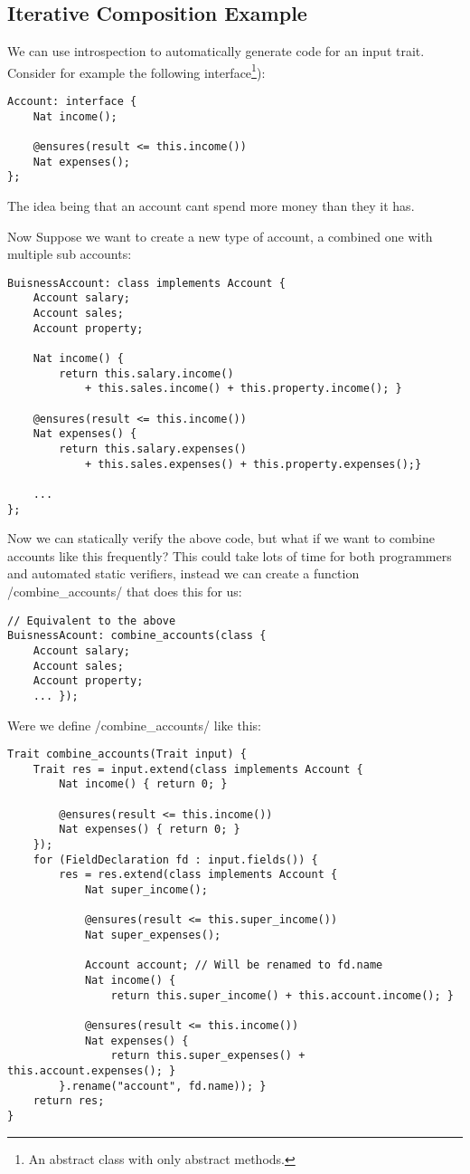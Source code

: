 \subsection{Iterative Composition Example}
We can use introspection to automatically generate code for an input trait. Consider for example the following interface\footnote{An abstract class with only abstract methods.}):
\begin{lstlisting}
Account: interface {
	Nat income();

	@ensures(result <= this.income())
	Nat expenses();
};
\end{lstlisting}

\noindent The idea being that an account cant spend more money than they it has.

Now Suppose we want to create a new type of account, a combined one with multiple sub accounts:
\begin{lstlisting}
BuisnessAccount: class implements Account {
	Account salary;
	Account sales;
	Account property;
	
	Nat income() {
		return this.salary.income() 
			+ this.sales.income() + this.property.income(); }
	
	@ensures(result <= this.income())
	Nat expenses() { 
		return this.salary.expenses() 
			+ this.sales.expenses() + this.property.expenses();}
		
	...
};
\end{lstlisting}

Now we can statically verify the above code, but what if we want to combine accounts like this frequently? This could take lots of time for both programmers and automated static verifiers, instead we can create a function /combine_accounts/ that does this for us:
\begin{lstlisting}
// Equivalent to the above
BuisnessAcount: combine_accounts(class { 
	Account salary;
	Account sales;
	Account property;
	... });
\end{lstlisting}

Were we define /combine_accounts/ like this:
\begin{lstlisting}
Trait combine_accounts(Trait input) {
	Trait res = input.extend(class implements Account {
		Nat income() { return 0; }

		@ensures(result <= this.income())
		Nat expenses() { return 0; }
	});
	for (FieldDeclaration fd : input.fields()) {
		res = res.extend(class implements Account {
			Nat super_income();
			
			@ensures(result <= this.super_income())
			Nat super_expenses();

			Account account; // Will be renamed to fd.name
			Nat income() { 
				return this.super_income() + this.account.income(); }

			@ensures(result <= this.income())
			Nat expenses() { 
				return this.super_expenses() + this.account.expenses(); }
		}.rename("account", fd.name)); }
	return res;
}
\end{lstlisting}

